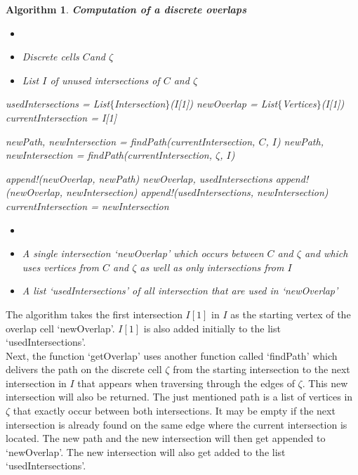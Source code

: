 \documentclass[a4paper,12pt,leqno]{article}
\theoremstyle{plain}
\newtheorem{algorithm}[theorem]{Algorithm}
\theoremstyle{remark}
\begin{document}
\begin{algorithm} \textbf{Computation of a discrete overlaps} \label{alge:discreteOverlap}
	\begin{itemize} 
		\itemsep0em 
		\item[] 
		\item Discrete cells  $C$and $\zeta$
		\item List $I$ of unused intersections of $C$ and $\zeta$ 
	\end{itemize}
	\begin{algorithmic}
			\State usedIntersections = List$\{$Intersection$\}$(I[1]) 
			\State newOverlap = List$\{$Vertices$\}$(I[1]) 
			\State currentIntersection = I[1]
			
			
					\State newPath, newIntersection = findPath(currentIntersection, $C$, $I$) 
				\Else 
					\State newPath, newIntersection = findPath(currentIntersection, $\zeta$, $I$) 
				\EndIf
				
				\State append!(newOverlap, newPath)
					\State \Return newOverlap, usedIntersections
				\Else 
					\State append!(newOverlap, newIntersection)
					\State append!(usedIntersections, newIntersection) 
					\State currentIntersection = newIntersection
				\EndIf
			\EndFor
		\EndFunction
	\end{algorithmic}
	\begin{itemize} 
		\itemsep0em 
		\item[] 
		\item A single intersection `newOverlap' which occurs between $C$ and $\zeta$ and which uses vertices from  $C$ and $\zeta$ as well as only intersections from $I$
		\item A list `usedIntersections' of all intersection that are used in `newOverlap'
	\end{itemize}	
\end{algorithm}
The algorithm takes the first intersection $I[1]$ in $I$ as the starting vertex of the overlap cell `newOverlap'. $I[1]$ is also added initially to the list `usedIntersections'. \\
Next, the function `getOverlap' uses another function called `findPath' which delivers the path on the discrete cell $\zeta$ from the starting intersection to the next intersection in $I$ that appears when traversing through the edges of $\zeta$. This new intersection will also be returned. The just mentioned path is a list of vertices in $\zeta$ that exactly occur between both intersections. It may be empty if the next intersection is already found on the same edge where the current intersection is located. The new path and the new intersection will then get appended to `newOverlap'. The new intersection will also get added to the list `usedIntersections'. \\
\end{document}
